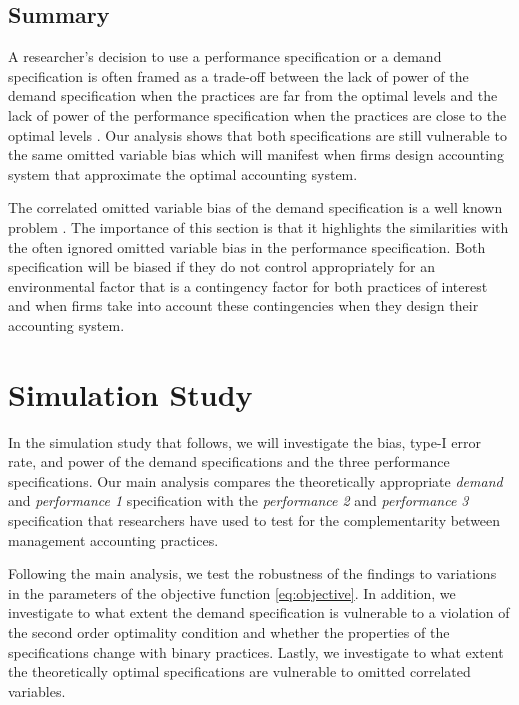 \documentclass[12pt]{article}
\begin{document}
\subsection{Summary}

A researcher's decision to use a performance specification or a demand specification is often framed as a trade-off between the lack of power of the demand specification when the practices are far from the optimal levels and the lack of power of the performance specification when the practices are close to the optimal levels \citep{grabner_management_2013, aral_three-way_2012,johansson_testing_2018}. Our analysis shows that both specifications are still vulnerable to the same omitted variable bias which will manifest when firms design accounting system that approximate the optimal accounting system.

The correlated omitted variable bias of the demand specification is a well known problem \citep{grabner_management_2013,arora_testing_1996,carree_note_2011}. The importance of this section is that it highlights the similarities with the often ignored omitted variable bias in the performance specification. Both specification will be biased if they do not control appropriately for an environmental factor that is a contingency factor for both practices of interest and when firms take into account these contingencies when they design their accounting system.

\section{Simulation Study}\label{simulation-study}

In the simulation study that follows, we will investigate the bias, type-I error rate, and power of the demand specifications and the three performance specifications. Our main analysis compares the theoretically appropriate \emph{demand} and \emph{performance 1} specification with the \emph{performance 2} and \emph{performance 3} specification that researchers have used to test for the complementarity between management accounting practices.  

Following the main analysis, we test the robustness of the findings to variations in the parameters of the objective function \ref{eq:objective}. In addition, we investigate to what extent the demand specification is vulnerable to a violation of the second order optimality condition and whether the properties of the specifications change with binary practices. Lastly, we investigate to what extent the theoretically optimal specifications are vulnerable to omitted correlated variables. 
\end{document}
